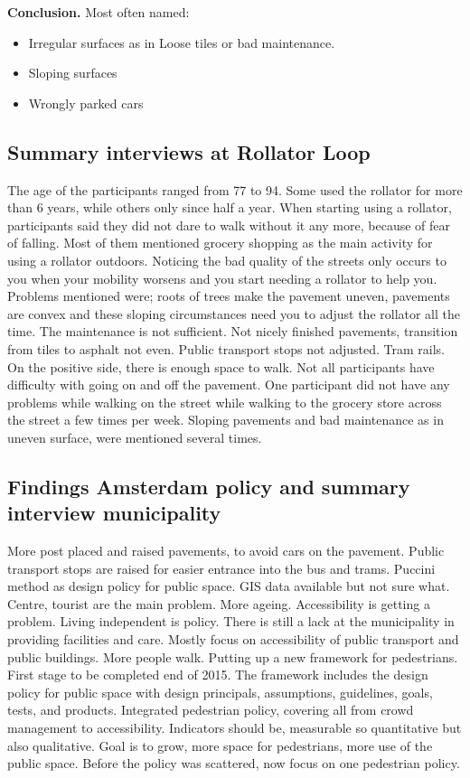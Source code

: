 \textbf{Conclusion.} Most often named: 
\begin{itemize}
\item Irregular surfaces as in Loose tiles or bad maintenance. 
\item Sloping surfaces
\item Wrongly parked cars
\end{itemize}


\subsection{Summary interviews at Rollator Loop}
The age of the participants ranged from 77 to 94. Some used the rollator for more than 6 years, while others only since half a year. When starting using a rollator, participants said they did not dare to walk without it any more, because of fear of falling. Most of them mentioned grocery shopping as the main activity for using a rollator outdoors.
Noticing the bad quality of the streets only occurs to you when your mobility worsens and you start needing a rollator to help you. 
Problems mentioned were; roots of trees make the pavement uneven, pavements are convex and these sloping circumstances need you to adjust the rollator all the time. The maintenance is not sufficient. Not nicely finished pavements, transition from tiles to asphalt not even. Public transport stops not adjusted. Tram rails. 
On the positive side, there is enough space to walk. Not all participants have difficulty with going on and off the pavement. 
One participant did not have any problems while walking on the street while walking to the grocery store across the street a few times per week. 
Sloping pavements and bad maintenance as in uneven surface, were mentioned several times. 

\subsection{Findings Amsterdam policy and summary interview municipality}
More post placed and raised pavements, to avoid cars on the pavement.
Public transport stops are raised for easier entrance into the bus and trams. 
Puccini method as design policy for public space. 
GIS data available but not sure what. 
Centre, tourist are the main problem. 
More ageing. Accessibility is getting a problem. Living independent is policy. There is still a lack at the municipality in providing facilities and care. 
Mostly focus on accessibility of public transport and public buildings. 
More people walk. 
Putting up a new framework for pedestrians. First stage to be completed end of 2015. The framework includes the design policy for public space with design principals, assumptions, guidelines, goals, tests, and products. 
Integrated pedestrian policy, covering all from crowd management to accessibility. 
Indicators should be, measurable so quantitative but also qualitative.
Goal is to grow, more space for pedestrians, more use of the public space.
Before the policy was scattered, now focus on one pedestrian policy. 


